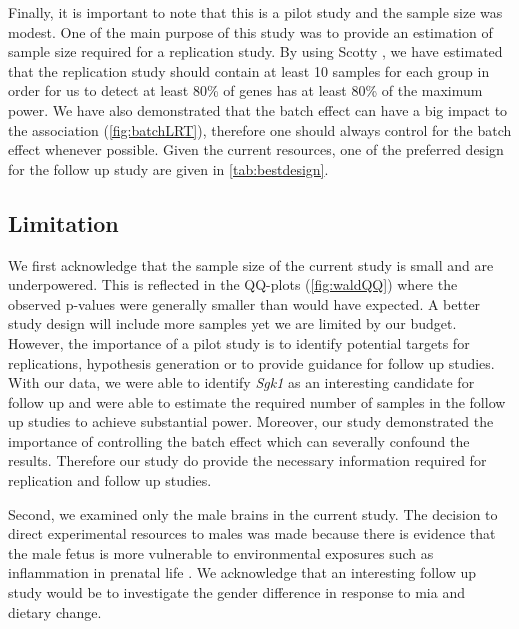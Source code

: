 Finally, it is important to note that this is a pilot study and the sample size was modest. 
One of the main purpose of this study was to provide an estimation of sample size required for a replication study.
By using Scotty \citep{Busby2013}, we have estimated that the replication study should contain at least 10 samples for each group in order for us to detect at least 80\% of genes has at least 80\% of the maximum power. 
We have also demonstrated that the batch effect can have a big impact to the association (\cref{fig:batchLRT}), therefore one should always control for the batch effect whenever possible.
Given the current resources, one of the preferred design for the follow up study are given in \cref{tab:bestdesign}.

\subsection{Limitation}
We first acknowledge that the sample size of the current study is small and are underpowered.
This is reflected in the QQ-plots (\cref{fig:waldQQ}) where the observed p-values were generally smaller than would have expected.
A better study design will include more samples yet we are limited by our budget.
However, the importance of a pilot study is to identify potential targets for replications, hypothesis generation or to provide guidance for follow up studies. 
With our data, we were able to identify \textit{Sgk1} as an interesting candidate for follow up and were able to estimate the required number of samples in the follow up studies to achieve substantial power.
Moreover, our study demonstrated the importance of controlling the batch effect which can severally confound the results.
Therefore our study do provide the necessary information required for replication and follow up studies.

Second, we examined only the male brains in the current study. 
The decision to direct experimental resources to males was made because there is evidence that the male fetus is more vulnerable to environmental exposures such as inflammation in prenatal life \citep{Bergeron2013,Lein2007}. 
We acknowledge that an interesting follow up study would be to investigate the gender difference in response to \gls{mia} and dietary change.

